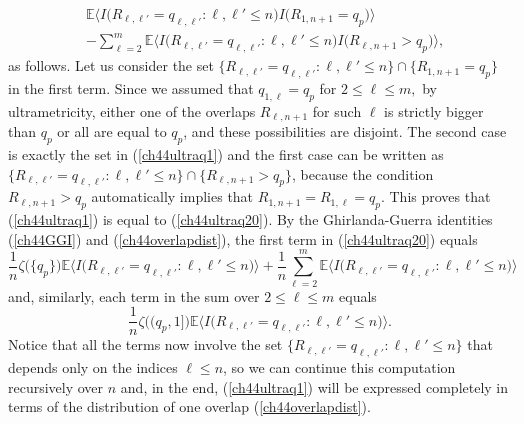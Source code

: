 \documentclass[12pt]{article}
\newcommand{\e}{\mathbb{E}}
\newcommand{\la}{\langle}
\newcommand{\ra}{\rangle}
\theoremstyle{nonumberplain}
\begin{document}
\begin{align}
&
\e \bigl\la I\bigl(R_{\ell,\ell'} = q_{\ell,\ell'} : \ell,\ell'\leq n\bigr) I\bigl(R_{1,n+1} = q_{p}\bigr) \bigr\ra
\nonumber
\\
& - \sum_{\ell=2}^m \e \bigl\la I\bigl(R_{\ell,\ell'} = q_{\ell,\ell'} : \ell,\ell'\leq n\bigr) I\bigl(R_{\ell,n+1} >q_{p}\bigr) \bigr\ra,
\label{ch44ultraq20}
\end{align}
as follows. Let us consider the set $\{R_{\ell,\ell'} = q_{\ell,\ell'} : \ell,\ell'\leq n \}\cap \{R_{1,n+1} = q_{p}\}$ in the first term. Since we assumed that $q_{1,\ell}=q_{p}$ for $2\leq \ell\leq m,$ by ultrametricity, either one of the overlaps $R_{\ell,n+1}$ for such $\ell$ is strictly bigger than $q_{p}$ or all are equal to $q_{p}$, and these possibilities are disjoint. The second case is exactly the set in (\ref{ch44ultraq1}) and the first case can be written as $\{R_{\ell,\ell'} = q_{\ell,\ell'} : \ell,\ell'\leq n \}\cap \{R_{\ell,n+1} > q_{p}\}$, because the condition $R_{\ell,n+1} > q_{p}$ automatically implies that $R_{1,n+1} = R_{1,\ell}=q_p.$ This proves that (\ref{ch44ultraq1}) is equal to (\ref{ch44ultraq20}). By the Ghirlanda-Guerra identities (\ref{ch44GGI}) and (\ref{ch44overlapdist}), the first term in (\ref{ch44ultraq20}) equals 
$$
\frac{1}{n}\zeta\bigl(\{q_{p}\}\bigr)\e \bigl\la I\bigl(R_{\ell,\ell'} = q_{\ell,\ell'} : \ell,\ell'\leq n\bigr) \bigr\ra
+
\frac{1}{n}\sum_{\ell=2}^m \e \bigl\la I\bigl(R_{\ell,\ell'} = q_{\ell,\ell'} : \ell,\ell'\leq n \bigr) \bigr\ra
$$
and, similarly, each term in the sum over $2\leq \ell\leq m$ equals
$$
\frac{1}{n}\zeta\bigl((q_{p}, 1]\bigr)\e \bigl\la I\bigl(R_{\ell,\ell'} = q_{\ell,\ell'} : \ell,\ell'\leq n\bigr) \bigr\ra.
$$
Notice that all the terms now involve the set $\{R_{\ell,\ell'} = q_{\ell,\ell'} : \ell,\ell'\leq n\}$ that depends only on the indices $\ell\leq n$, so we can continue this computation recursively over $n$ and, in the end, (\ref{ch44ultraq1}) will be expressed completely in terms of the distribution of one overlap (\ref{ch44overlapdist}). 
\end{document}
